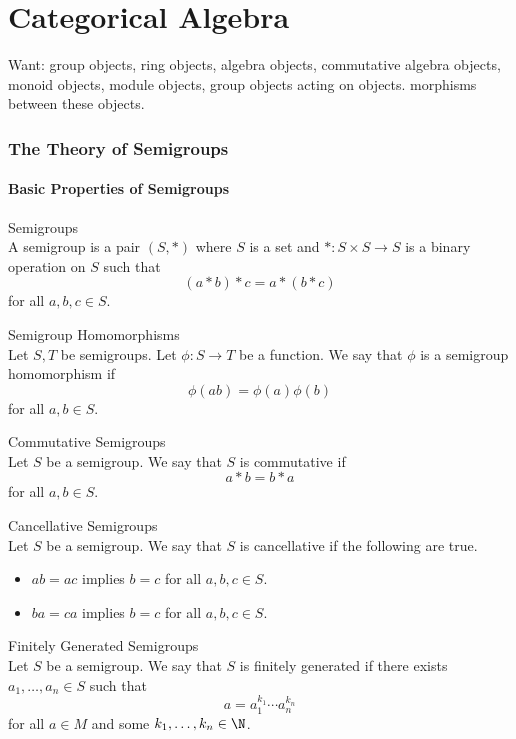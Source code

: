 \documentclass[a4paper]{article}
\begin{document}
\pagebreak
\part{Categorical Algebra}
Want: group objects, ring objects, algebra objects, commutative algebra objects, monoid objects, module objects, group objects acting on objects. morphisms between these objects. 

\pagebreak
\section{The Theory of Semigroups}
\subsection{Basic Properties of Semigroups}
\begin{defn}{Semigroups}{}\\
A semigroup is a pair $(S,\ast)$ where $S$ is a set and $\ast:S\times S\to S$ is a binary operation on $S$ such that $$(a\ast b)\ast c=a\ast(b\ast c)$$ for all $a,b,c\in S$. 
\end{defn}

\begin{defn}{Semigroup Homomorphisms}{}\\
Let $S,T$ be semigroups. Let $\phi:S\to T$ be a function. We say that $\phi$ is a semigroup homomorphism if $$\phi(ab)=\phi(a)\phi(b)$$ for all $a,b\in S$. 
\end{defn}

\begin{defn}{Commutative Semigroups}{}\\
Let $S$ be a semigroup. We say that $S$ is commutative if $$a\ast b=b\ast a$$ for all $a,b\in S$. 
\end{defn}

\begin{defn}{Cancellative Semigroups}{}\\
Let $S$ be a semigroup. We say that $S$ is cancellative if the following are true. 
\begin{itemize}
\item $ab=ac$ implies $b=c$ for all $a,b,c\in S$. 
\item $ba=ca$ implies $b=c$ for all $a,b,c\in S$. 
\end{itemize}
\end{defn}

\begin{defn}{Finitely Generated Semigroups}{}\\
Let $S$ be a semigroup. We say that $S$ is finitely generated if there exists $a_1,\dots,a_n\in S$ such that $$a=a_1^{k_1}\cdots a_n^{k_n}$$ for all $a\in M$ and some $k_1,\dots,k_n\in\N$. 
\end{defn}
\end{document}
